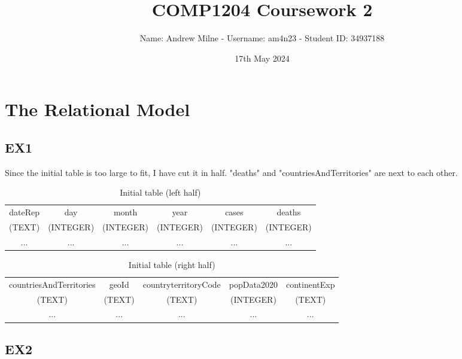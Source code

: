 \documentclass{article}
\title{COMP1204 Coursework 2}
\author{Name: Andrew Milne - Username: am4n23 - Student ID: 34937188}
\date{17th May 2024}
\begin{document}
\maketitle

\tableofcontents

\newpage

\section{The Relational Model}

\subsection{EX1}

Since the initial table is too large to fit, I have cut it in half. "deaths" and "countriesAndTerritories" are next to each other.

\begin{table}[ht]
\centering
\begin{tabular}{|c|c|c|c|c|c|}
    \hline
    dateRep&day&month&year&cases&deaths\\
    (TEXT)&(INTEGER)&(INTEGER)&(INTEGER)&(INTEGER)&(INTEGER)\\
    \hline
    ...&...&...&...&...&...\\
    \hline
\end{tabular}
\caption{Initial table (left half)}
\label{StartTableLeft}
\end{table}

\begin{table}[ht]
\centering
\begin{tabular}{|c|c|c|c|c|}
    \hline
    countriesAndTerritories&geoId&countryterritoryCode&popData2020&continentExp\\
    (TEXT)&(TEXT)&(TEXT)&(INTEGER)&(TEXT)\\
    \hline
    ...&...&...&...&...\\
    \hline
\end{tabular}
\caption{Initial table (right half)}
\label{StartTableRight}
\end{table}

\subsection{EX2}
\end{document}
